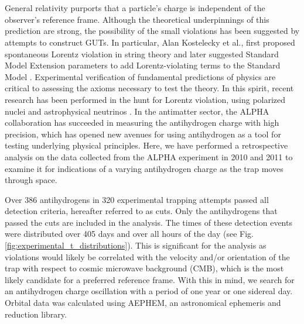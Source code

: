 \documentclass[superscriptaddress,aps,prb,11pt]{revtex4-1}
\begin{document}
\section{}
General relativity purports that a particle's charge is independent of the observer's reference frame.  Although the theoretical underpinnings of this prediction are strong, the possibility of the small violations has been suggested by attempts to construct GUTs. In particular, Alan Kostelecky et al., first proposed spontaneous Lorentz violation in string theory \cite{kostelecky1989spontaneous} and later suggested Standard Model Extension parameters to add Lorentz-violating terms to the Standard Model \cite{colladay1998lorentz}. Experimental verification of fundamental predictions of physics are critical to assessing the axioms necessary to test the theory.  In this spirit, recent research has been performed in the hunt for Lorentz violation, using polarized nuclei \cite{muller2013first} and astrophysical neutrinos \cite{diaz2014testing}.  In the antimatter sector, the ALPHA collaboration has succeeded in measuring the antihydrogen charge with high precision\cite{amol:14a}, which has opened new avenues for using antihydrogen as a tool for testing underlying physical principles.  Here, we have performed a retrospective analysis on the data collected from the ALPHA experiment in 2010 and 2011 to examine it for indications of a varying antihydrogen charge as the trap moves through space.

Over 386 antihydrogens in 320 experimental trapping attempts passed all detection criteria, hereafter referred to as cuts\cite{amol:14a}.  Only the antihydrogens that passed the cuts are included in the analysis.  The times of these detection events were distributed over 405 days and over all hours of the day (see Fig.\ref{fig:experimental_t_distributions}).  This is significant for the analysis as violations would likely be correlated with the velocity and/or orientation of the trap with respect to cosmic microwave background (CMB), which is the most likely candidate for a preferred reference frame. With this in mind, we search for an antihydrogen charge oscillation with a period of one year or one sidereal day. Orbital data was calculated using AEPHEM\cite{aephem}, an astronomical ephemeris and reduction library.
\end{document}
